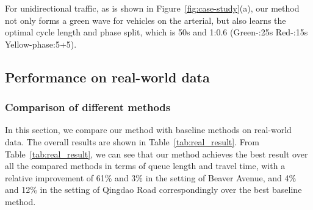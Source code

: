 

For unidirectional traffic, as is shown in Figure~\ref{fig:case-study}(a), our method not only forms a green wave for vehicles on the arterial, but also learns the optimal cycle length and phase split, which is 50s and 1:0.6 (Green-\WE:25s Red-\WE:15s Yellow-phase:5+5). 



\subsection{Performance on real-world data}
\subsubsection{Comparison of different methods} In this section, we compare our method with baseline methods on real-world data. The overall results are shown in Table~\ref{tab:real_result}.
From Table~\ref{tab:real_result}, we can see that our method \PressLight achieves the best result over all the compared methods in terms of queue length and travel time, with a relative improvement of 61\% and
3\% in the setting of Beaver Avenue, and 4\% and 12\% in the setting of Qingdao Road correspondingly over the best baseline method.


